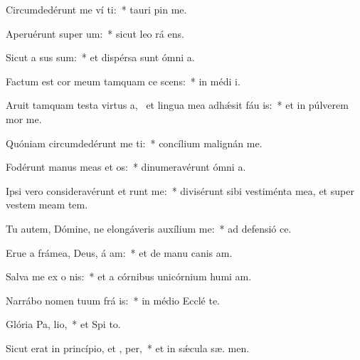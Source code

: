 \item Circumdedérunt me ví ti:~* tauri pin  me.
\item Aperuérunt super   um:~* sicut leo rá  ens.
\item Sicut a sus sum:~* et dispérsa sunt ómni  a.
\item Factum est cor meum tamquam ce scens:~* in médi  i.
\item Aruit tamquam testa virtus a,~\pscross{} et lingua mea adhǽsit fáu is:~* et in púlverem mor  me.
\item Quóniam circumdedérunt me  ti:~* concílium malignán  me.
\item Fodérunt manus meas et  os:~* dinumeravérunt ómni  a.
\item Ipsi vero consideravérunt et runt me:~* divisérunt sibi vestiménta mea, et super vestem meam  tem.
\item Tu autem, Dómine, ne elongáveris auxílium   me:~* ad defensió  ce.
\item Erue a frámea, Deus, á am:~* et de manu canis  am.
\item Salva me ex o nis:~* et a córnibus unicórnium humi am.
\item Narrábo nomen tuum frá is:~* in médio Ecclé  te.
\item Glória Pa,  lio,~* et Spi to.
\item Sicut erat in princípio, et ,  per,~* et in sǽcula sæ. men.
